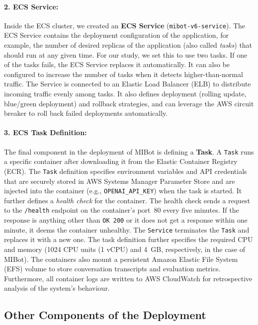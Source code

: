 \paragraph{2. ECS Service:}Inside the ECS cluster, we created an \textbf{ECS Service} (\texttt{mibot-v6-service}). The ECS Service contains the deployment configuration of the application, for example, the number of desired replicas of the application (also called \emph{tasks}) that should run at any given time.  For our study, we set this to use two tasks. If one of the tasks fails, the ECS Service replaces it automatically. It can also be configured to increase the number of tasks when it detects higher-than-normal traffic. The Service is connected to an Elastic Load Balancer (ELB) to distribute incoming traffic evenly among tasks. It also defines deployment (rolling update, blue/green deployment) and rollback strategies, and can leverage the AWS circuit breaker to roll back failed deployments automatically.

\paragraph{3. ECS Task Definition:}The final component in the deployment of MIBot is defining a \textbf{Task}. A \texttt{Task} runs a specific container after downloading it from the Elastic Container Registry (ECR). The \texttt{Task} definition specifies environment variables and API credentials that are securely stored in AWS Systems Manager Parameter Store and are injected into the container (e.g., \texttt{OPENAI\_API\_KEY}) when the task is started. It further defines a \emph{health check} for the container. The health check sends a request to the \texttt{/health} endpoint on the container's port~80 every five minutes. If the response is anything other than \texttt{OK 200} or it does not get a response within one minute, it deems the container unhealthy. The \texttt{Service} terminates the \texttt{Task} and replaces it with a new one. The task definition further specifies the required CPU and memory (1024 CPU units (1 vCPU) and 4~GB, respectively, in the case of MIBot). The containers also mount a persistent Amazon Elastic File System (EFS) volume to store conversation transcripts and evaluation metrics. Furthermore, all container logs are written to AWS CloudWatch for retrospective analysis of the system's behaviour.

\subsection{Other Components of the Deployment}


